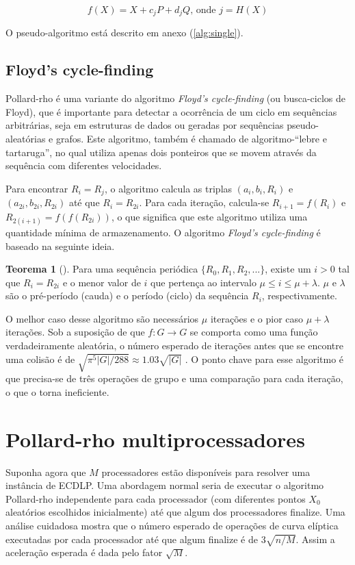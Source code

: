 \begin{equation*}
f(X) = X + c_jP + d_jQ \textrm{, onde } j = H(X)
\end{equation*}

O pseudo-algoritmo está descrito em anexo (\ref{alg:single}).

%
%
\subsection{Floyd's cycle-finding} \label{floyd}
Pollard-rho é uma variante do algoritmo \textit{Floyd's cycle-finding} (ou busca-ciclos de Floyd), que é importante para detectar a ocorrência de um ciclo em sequências arbitrárias, seja em estruturas de dados ou geradas por sequências pseudo-aleatórias e grafos. Este algoritmo, também é chamado de algoritmo-``lebre e tartaruga'', no qual utiliza apenas dois ponteiros que se movem através da sequência com diferentes velocidades.

Para encontrar \(R_i = R_j\), o algoritmo calcula as triplas $(a_i, b_i, R_i)$ e $(a_{2i}, b_{2i}, R_{2i})$ até que \(R_i = R_{2i}\). Para cada iteração, calcula-se \(R_{i+1} = f(R_i)\) e \(R_{2(i+1)} = f(f(R_{2i}))\), o que significa que este algoritmo utiliza uma quantidade mínima de armazenamento. O algoritmo \textit{Floyd's cycle-finding} é baseado na seguinte ideia. \cite{Ping:2011} \cite{Brent:2008}

\textbf{Teorema 1} (\cite{Knuth:1997}). Para uma sequência periódica \(\{R_0, R_1, R_2, ...\}\), existe um \(i > 0\) tal que \(R_i = R_{2i}\) e o menor valor de \(i\) que pertença ao intervalo \(\mu \leq i \leq \mu + \lambda\). \(\mu\) e \(\lambda\) são o pré-período (cauda) e o período (ciclo) da sequência \(R_i\), respectivamente.

O melhor caso desse algoritmo são necessários \(\mu\) iterações e o pior caso \(\mu + \lambda\) iterações. Sob a suposição de que \(f : G \to G\) se comporta como uma função verdadeiramente aleatória, o número esperado de iterações antes que se encontre uma colisão é de $\sqrt{\pi^5 |G|/288} \approx 1.03 \sqrt{|G|}$ \cite{Brent:2008}. O ponto chave para esse algoritmo é que precisa-se de três operações de grupo e uma comparação para cada iteração, o que o torna ineficiente.

%
%
\section{Pollard-rho multiprocessadores} \label{sec:parallelized}
Suponha agora que \(M\) processadores estão disponíveis para resolver uma instância de ECDLP. Uma abordagem normal seria de executar o algoritmo Pollard-rho independente para cada processador (com diferentes pontos \(X_0\) aleatórios escolhidos inicialmente) até que algum dos processadores finalize. Uma análise cuidadosa mostra que o número esperado de operações de curva elíptica executadas por cada processador até que algum finalize é de $3\sqrt{n/M}$. Assim a aceleração esperada é dada pelo fator $\sqrt{M}$. \cite{Guide}

